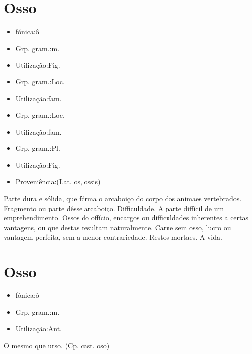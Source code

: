 \section{Osso}
\begin{itemize}
\item {fónica:ô}
\end{itemize}
\begin{itemize}
\item {Grp. gram.:m.}
\end{itemize}
\begin{itemize}
\item {Utilização:Fig.}
\end{itemize}
\begin{itemize}
\item {Grp. gram.:Loc.}
\end{itemize}
\begin{itemize}
\item {Utilização:fam.}
\end{itemize}
\begin{itemize}
\item {Grp. gram.:Loc.}
\end{itemize}
\begin{itemize}
\item {Utilização:fam.}
\end{itemize}
\begin{itemize}
\item {Grp. gram.:Pl.}
\end{itemize}
\begin{itemize}
\item {Utilização:Fig.}
\end{itemize}
\begin{itemize}
\item {Proveniência:(Lat. \textunderscore os\textunderscore , \textunderscore ossis\textunderscore )}
\end{itemize}
Parte dura e sólida, que fórma o arcaboiço do corpo dos animaes vertebrados.
Fragmento ou parte dêsse arcaboiço.
Difficuldade.
A parte diffícil de um emprehendimento.
\textunderscore Ossos do offício\textunderscore , encargos ou difficuldades inherentes a certas vantagens, ou que destas resultam naturalmente.
\textunderscore Carne sem osso\textunderscore , lucro ou vantagem perfeita, sem a menor contrariedade.
Restos mortaes.
A vida.
\section{Osso}
\begin{itemize}
\item {fónica:ô}
\end{itemize}
\begin{itemize}
\item {Grp. gram.:m.}
\end{itemize}
\begin{itemize}
\item {Utilização:Ant.}
\end{itemize}
O mesmo que \textunderscore urso\textunderscore .
(Cp. cast. \textunderscore oso\textunderscore )
